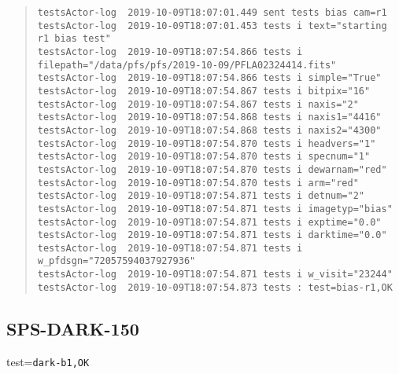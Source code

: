 \begin{quote}
\begin{tiny}
\begin{verbatim}
testsActor-log  2019-10-09T18:07:01.449 sent tests bias cam=r1
testsActor-log  2019-10-09T18:07:01.453 tests i text="starting r1 bias test"
testsActor-log  2019-10-09T18:07:54.866 tests i filepath="/data/pfs/pfs/2019-10-09/PFLA02324414.fits"
testsActor-log  2019-10-09T18:07:54.866 tests i simple="True"
testsActor-log  2019-10-09T18:07:54.867 tests i bitpix="16"
testsActor-log  2019-10-09T18:07:54.867 tests i naxis="2"
testsActor-log  2019-10-09T18:07:54.868 tests i naxis1="4416"
testsActor-log  2019-10-09T18:07:54.868 tests i naxis2="4300"
testsActor-log  2019-10-09T18:07:54.870 tests i headvers="1"
testsActor-log  2019-10-09T18:07:54.870 tests i specnum="1"
testsActor-log  2019-10-09T18:07:54.870 tests i dewarnam="red"
testsActor-log  2019-10-09T18:07:54.870 tests i arm="red"
testsActor-log  2019-10-09T18:07:54.871 tests i detnum="2"
testsActor-log  2019-10-09T18:07:54.871 tests i imagetyp="bias"
testsActor-log  2019-10-09T18:07:54.871 tests i exptime="0.0"
testsActor-log  2019-10-09T18:07:54.871 tests i darktime="0.0"
testsActor-log  2019-10-09T18:07:54.871 tests i w_pfdsgn="72057594037927936"
testsActor-log  2019-10-09T18:07:54.871 tests i w_visit="23244"
testsActor-log  2019-10-09T18:07:54.873 tests : test=bias-r1,OK
\end{verbatim}
\end{tiny}
\end{quote}

\subsection{SPS-DARK-150}
\label{sec:tc-150}

test=\texttt{dark-b1,OK}


